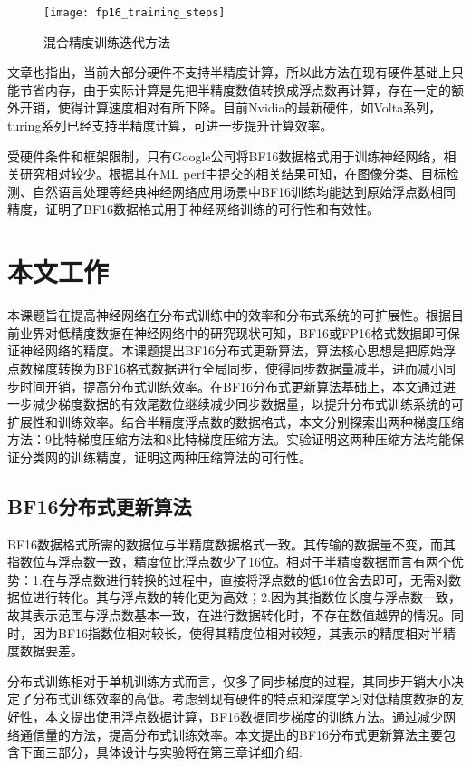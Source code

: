 \begin{figure}[htp]
\centering
\texttt{[image: fp16\_training\_steps]}
\caption{混合精度训练迭代方法}
\label{fig:fp16_training_steps}
\end{figure}
文章也指出，当前大部分硬件不支持半精度计算，所以此方法在现有硬件基础上只能节省内存，由于实际计算是先把半精度数值转换成浮点数再计算，存在一定的额外开销，使得计算速度相对有所下降。目前Nvidia的最新硬件，如Volta系列，turing系列已经支持半精度计算，可进一步提升计算效率。

受硬件条件和框架限制，只有Google公司将BF16数据格式用于训练神经网络，相关研究相对较少。根据其在ML perf中提交的相关结果可知，在图像分类、目标检测、自然语言处理等经典神经网络应用场景中BF16训练均能达到原始浮点数相同精度，证明了BF16数据格式用于神经网络训练的可行性和有效性。

\section{本文工作}
本课题旨在提高神经网络在分布式训练中的效率和分布式系统的可扩展性。根据目前业界对低精度数据在神经网络中的研究现状可知，BF16或FP16格式数据即可保证神经网络的精度。本课题提出BF16分布式更新算法，算法核心思想是把原始浮点数梯度转换为BF16格式数据进行全局同步，使得同步数据量减半，进而减小同步时间开销，提高分布式训练效率。在BF16分布式更新算法基础上，本文通过进一步减少梯度数据的有效尾数位继续减少同步数据量，以提升分布式训练系统的可扩展性和训练效率。结合半精度浮点数的数据格式，本文分别探索出两种梯度压缩方法：9比特梯度压缩方法和8比特梯度压缩方法。实验证明这两种压缩方法均能保证分类网的训练精度，证明这两种压缩算法的可行性。

\subsection{BF16分布式更新算法}
BF16数据格式所需的数据位与半精度数据格式一致。其传输的数据量不变，而其指数位与浮点数一致，精度位比浮点数少了16位。相对于半精度数据而言有两个优势：1.在与浮点数进行转换的过程中，直接将浮点数的低16位舍去即可，无需对数据位进行转化。其与浮点数的转化更为高效；2.因为其指数位长度与浮点数一致，故其表示范围与浮点数基本一致，在进行数据转化时，不存在数值越界的情况。同时，因为BF16指数位相对较长，使得其精度位相对较短，其表示的精度相对半精度数据要差。

分布式训练相对于单机训练方式而言，仅多了同步梯度的过程，其同步开销大小决定了分布式训练效率的高低。考虑到现有硬件的特点和深度学习对低精度数据的友好性，本文提出使用浮点数据计算，BF16数据同步梯度的训练方法。通过减少网络通信量的方法，提高分布式训练效率。本文提出的BF16分布式更新算法主要包含下面三部分，具体设计与实验将在第三章详细介绍:

